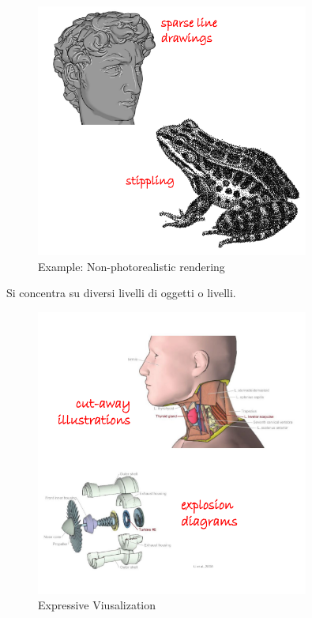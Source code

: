 \begin{figure}[H]
    \centering
    \includegraphics[width=0.8\textwidth]{images/NPR.png} 
    \caption{Example: Non-photorealistic rendering}
    \label{fig:immagine}
\end{figure}  
Si concentra su diversi livelli di oggetti o livelli.
\begin{figure}[H]
    \centering
    \includegraphics[width=0.8\textwidth]{images/ExpresViusal.png} 
    \caption{Expressive Viusalization}
    \label{fig:immagine}
\end{figure}  